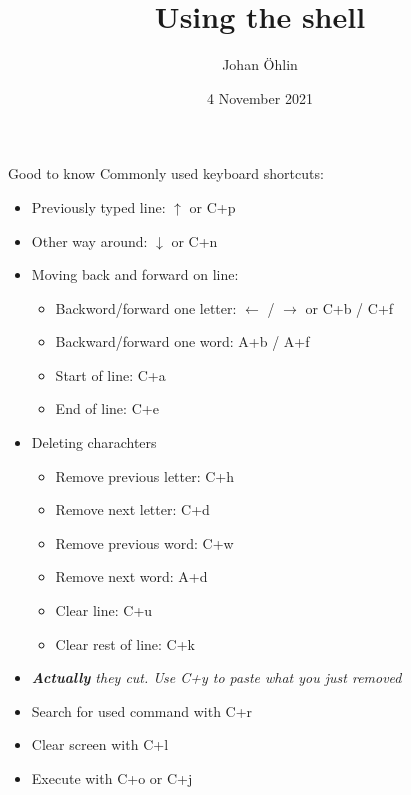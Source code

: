 \documentclass{beamer}
\title{Using the shell}
\date{4 November 2021}
\author{Johan Öhlin}
\institute{Yabs}
\let\bf\textbf
\let\it\itshape
\begin{document}
\maketitle

\begin{frame}{Good to know}
        Commonly used keyboard shortcuts: \\
        \begin{itemize}
                \item Previously typed line: $\uparrow$ or C+p
                \item Other way around: $\downarrow$ or C+n
                \item Moving back and forward on line:
                        \begin{itemize}
                                \item Backword/forward one letter: $\leftarrow$ / $\rightarrow$ or C+b / C+f
                                \item Backward/forward one word: A+b / A+f
                                \item Start of line: C+a
                                \item End of line: C+e
                        \end{itemize}
                \item Deleting charachters
                        \begin{itemize}
                                \item Remove previous letter: C+h
                                \item Remove next letter: C+d
                                \item Remove previous word: C+w
                                \item Remove next word: A+d
                                \item Clear line: C+u
                                \item Clear rest of line: C+k
                        \end{itemize}
                \item \it{\bf{Actually}} they cut. Use C+y to paste what you just removed
                \item Search for used command with C+r
                \item Clear screen with C+l
                \item Execute with C+o or C+j
        \end{itemize}
\end{frame}
\end{document}
